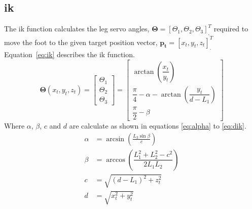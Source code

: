     \subsection{\acf{ik}}
        The \ac{ik} function calculates the leg servo angles, \(\boldsymbol{\Theta} = [\Theta_1, \Theta_2, \Theta_3]^T_{\displaystyle ,}\) required
        to move the foot to the given target position vector, \(\boldsymbol{p_t} = [x_t,y_t,z_t]^T_{\displaystyle .}\)
        \hbox{Equation \ref{eq:ik}} describes the \ac{ik} function.
        \begin{equation}\label{eq:ik}
            \boldsymbol{\Theta}(x_t,y_t,z_t) =
                                \begin{bmatrix}
                                    \Theta_1\\
                                    \Theta_2\\
                                    \Theta_3
                                \end{bmatrix}
                                =
                                \begin{bmatrix}
                                    \arctan{\left(\dfrac{x_t}{y_t}\right)}\\[0.5cm]
                                    \dfrac{\pi}{4} - \alpha - \arctan{\left(\dfrac{y_t}{d-L_1}\right)}\\[0.5cm]
                                    \dfrac{\pi}{2} - \beta
                                \end{bmatrix}
        \end{equation}
        Where \(\alpha\), \(\beta\), \(c\) and \(d\) are calculate as shown in equations \ref{eq:alpha} to \ref{eq:dik}.
        \begin{align}
            \alpha &= \arcsin{\left(\frac{L_3\sin{\beta}}{c}\right)} \label{eq:alpha} \\
            \beta &= \arccos{\left(\dfrac{L_1^2 + L_2^2 -c^2}{2L_1L_2}\right)}\\
            c &= \sqrt{(d-L_1)^2+z_t^2}\\
            d &= \sqrt{x_t^2 + y_t^2} \label{eq:dik}
        \end{align}
